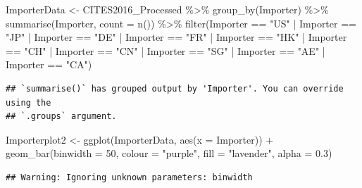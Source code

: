 \documentclass[
  12pt,
]{article}
\newenvironment{Shaded}{\begin{snugshade}}{\end{snugshade}}
\newcommand{\AttributeTok}[1]{\textcolor[rgb]{0.77,0.63,0.00}{#1}}
\newcommand{\DecValTok}[1]{\textcolor[rgb]{0.00,0.00,0.81}{#1}}
\newcommand{\FloatTok}[1]{\textcolor[rgb]{0.00,0.00,0.81}{#1}}
\newcommand{\FunctionTok}[1]{\textcolor[rgb]{0.00,0.00,0.00}{#1}}
\newcommand{\NormalTok}[1]{#1}
\newcommand{\OtherTok}[1]{\textcolor[rgb]{0.56,0.35,0.01}{#1}}
\newcommand{\SpecialCharTok}[1]{\textcolor[rgb]{0.00,0.00,0.00}{#1}}
\newcommand{\StringTok}[1]{\textcolor[rgb]{0.31,0.60,0.02}{#1}}
\begin{document}
\begin{Shaded}
\begin{Highlighting}[]
\NormalTok{ImporterData }\OtherTok{\textless{}{-}}\NormalTok{ CITES2016\_Processed }\SpecialCharTok{\%\textgreater{}\%}
    \FunctionTok{group\_by}\NormalTok{(Importer) }\SpecialCharTok{\%\textgreater{}\%}
    \FunctionTok{summarise}\NormalTok{(Importer, }\AttributeTok{count =} \FunctionTok{n}\NormalTok{()) }\SpecialCharTok{\%\textgreater{}\%}
    \FunctionTok{filter}\NormalTok{(Importer }\SpecialCharTok{==} \StringTok{"US"} \SpecialCharTok{|}\NormalTok{ Importer }\SpecialCharTok{==} \StringTok{"JP"} \SpecialCharTok{|}\NormalTok{ Importer }\SpecialCharTok{==} \StringTok{"DE"} \SpecialCharTok{|}\NormalTok{ Importer }\SpecialCharTok{==} \StringTok{"FR"} \SpecialCharTok{|}
\NormalTok{        Importer }\SpecialCharTok{==} \StringTok{"HK"} \SpecialCharTok{|}\NormalTok{ Importer }\SpecialCharTok{==} \StringTok{"CH"} \SpecialCharTok{|}\NormalTok{ Importer }\SpecialCharTok{==} \StringTok{"CN"} \SpecialCharTok{|}\NormalTok{ Importer }\SpecialCharTok{==} \StringTok{"SG"} \SpecialCharTok{|}
\NormalTok{        Importer }\SpecialCharTok{==} \StringTok{"AE"} \SpecialCharTok{|}\NormalTok{ Importer }\SpecialCharTok{==} \StringTok{"CA"}\NormalTok{)}
\end{Highlighting}
\end{Shaded}

\begin{verbatim}
## `summarise()` has grouped output by 'Importer'. You can override using the
## `.groups` argument.
\end{verbatim}

\begin{Shaded}
\begin{Highlighting}[]
\NormalTok{Importerplot2 }\OtherTok{\textless{}{-}} \FunctionTok{ggplot}\NormalTok{(ImporterData, }\FunctionTok{aes}\NormalTok{(}\AttributeTok{x =}\NormalTok{ Importer)) }\SpecialCharTok{+} \FunctionTok{geom\_bar}\NormalTok{(}\AttributeTok{binwidth =} \DecValTok{50}\NormalTok{,}
    \AttributeTok{colour =} \StringTok{"purple"}\NormalTok{, }\AttributeTok{fill =} \StringTok{"lavender"}\NormalTok{, }\AttributeTok{alpha =} \FloatTok{0.3}\NormalTok{)}
\end{Highlighting}
\end{Shaded}

\begin{verbatim}
## Warning: Ignoring unknown parameters: binwidth
\end{verbatim}
\end{document}
